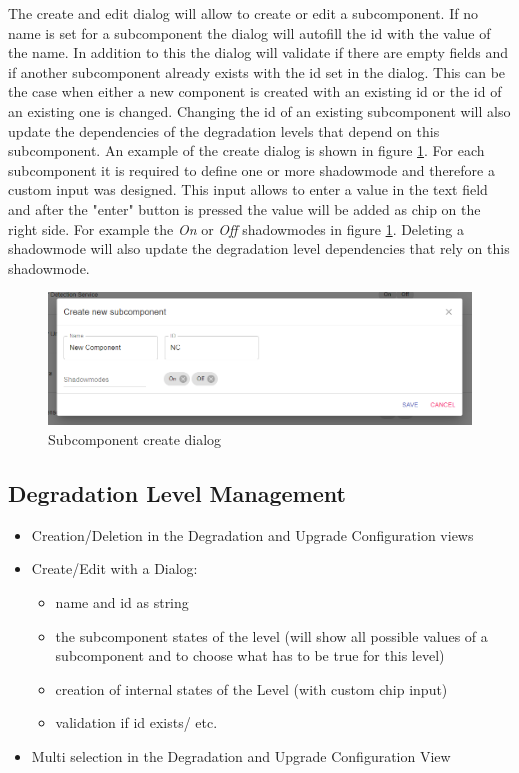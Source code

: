 The create and edit dialog will allow to create or edit a subcomponent. If no name is set for a subcomponent the dialog will autofill the id with the value of the name. In addition to this the dialog will validate if there are empty fields and if another subcomponent already exists with the id set in the dialog. This can be the case when either a new component is created with an existing id or the id of an existing one is changed. Changing the id of an existing subcomponent will also update the dependencies of the degradation levels that depend on this subcomponent. An example of the create dialog is shown in figure \ref{fig:subcomponent_create_dialog}. For each subcomponent it is required to define one or more shadowmode and therefore a custom input was designed. This input allows to enter a value in the text field and after the "enter" button is pressed the value will be added as chip on the right side. For example the \textit{On} or \textit{Off} shadowmodes in figure \ref{fig:subcomponent_create_dialog}. Deleting a shadowmode will also update the degradation level dependencies that rely on this shadowmode.

\begin{figure}[ht]
    \centering
    \includegraphics[width=\textwidth]{img/subcomponents_create.png}
    \caption{Subcomponent create dialog}
    \label{fig:subcomponent_create_dialog}
\end{figure}


\subsection{Degradation Level Management}
\begin{itemize}
    \item Creation/Deletion in the Degradation and Upgrade Configuration views
    \item Create/Edit with a Dialog:
    \begin{itemize}
        \item name and id as string
        \item the subcomponent states of the level (will show all possible values of a subcomponent and to choose what has to be true for this level)
        \item creation of internal states of the Level (with custom chip input)
        \item validation if id exists/ etc.
    \end{itemize}
    \item Multi selection in the Degradation and Upgrade Configuration View
\end{itemize}


